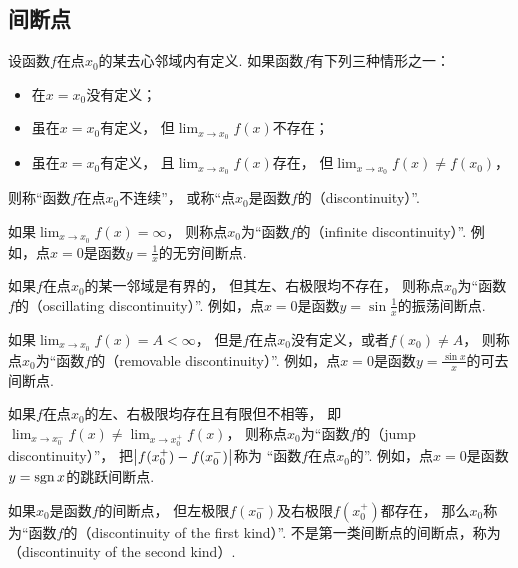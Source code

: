 \subsection{间断点}
\begin{definition}
设函数\(f\)在点\(x_0\)的某去心邻域内有定义.
如果函数\(f\)有下列三种情形之一：
\begin{itemize}
	\item 在\(x=x_0\)没有定义；
	\item 虽在\(x=x_0\)有定义，
	但\(\lim_{x \to x_0} f(x)\)不存在；
	\item 虽在\(x=x_0\)有定义，
	且\(\lim_{x \to x_0} f(x)\)存在，
	但\(\lim_{x \to x_0} f(x) \neq f(x_0)\)，
\end{itemize}
则称“函数\(f\)在点\(x_0\)不连续”，
或称“点\(x_0\)是函数\(f\)的（discontinuity）”.
\end{definition}

如果\(\lim_{x \to x_0} f(x) = \infty\)，
则称点\(x_0\)为“函数\(f\)的（infinite discontinuity）”.
例如，点\(x=0\)是函数\(y=\frac{1}{x}\)的无穷间断点.

如果\(f\)在点\(x_0\)的某一邻域是有界的，
但其左、右极限均不存在，
则称点\(x_0\)为“函数\(f\)的（oscillating discontinuity）”.
例如，点\(x=0\)是函数\(y=\sin\frac{1}{x}\)的振荡间断点.

如果\(\lim_{x \to x_0} f(x) = A < \infty\)，
但是\(f\)在点\(x_0\)没有定义，或者\(f(x_0) \neq A\)，
则称点\(x_0\)为“函数\(f\)的（removable discontinuity）”.
例如，点\(x=0\)是函数\(y=\frac{\sin x}{x}\)的可去间断点.

如果\(f\)在点\(x_0\)的左、右极限均存在且有限但不相等，
即\(\lim_{x \to x_0^-} f(x) \neq \lim_{x \to x_0^+} f(x)\)，
则称点\(x_0\)为“函数\(f\)的（jump discontinuity）”，
把\(\abs{f(x_0^+)-f(x_0^-)}\)称为
“函数\(f\)在点\(x_0\)的”.
例如，点\(x=0\)是函数\(y=\operatorname{sgn} x\)的跳跃间断点.

如果\(x_0\)是函数\(f\)的间断点，
但左极限\(f(x_0^-)\)及右极限\(f(x_0^+)\)都存在，
那么\(x_0\)称为“函数\(f\)的（discontinuity of the first kind）”.
不是第一类间断点的间断点，称为（discontinuity of the second kind）.

